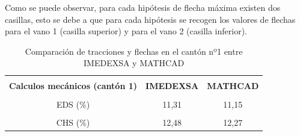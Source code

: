 Como se puede observar, para cada hipótesis de flecha máxima existen dos casillas, esto se debe a que para cada hipótesis se recogen los valores de flechas para el vano 1 (casilla superior) y para el vano 2 (casilla inferior).
\begin{table}[H]
\caption{Comparación de tracciones y flechas en el cantón nº1 entre IMEDEXSA y MATHCAD}
\centering
\label{tab:flechas}
\begin{tabular}{|cc|cc|}
\hline
\multicolumn{2}{|c|}{\cellcolor[HTML]{EFEFEF}}                                                                                                                                                       & \multicolumn{1}{c|}{\cellcolor[HTML]{EFEFEF}}                                    & \cellcolor[HTML]{EFEFEF}                                   \\
\multicolumn{2}{|c|}{\multirow{-2}{*}{\cellcolor[HTML]{EFEFEF}\textbf{Calculos mecánicos (cantón 1)}}}                                                                                               & \multicolumn{1}{c|}{\multirow{-2}{*}{\cellcolor[HTML]{EFEFEF}\textbf{IMEDEXSA}}} & \multirow{-2}{*}{\cellcolor[HTML]{EFEFEF}\textbf{MATHCAD}} \\ \hline
\multicolumn{2}{|c|}{}                                                                                                                                                                               & \multicolumn{1}{c|}{}                                                            &                                                            \\
\multicolumn{2}{|c|}{\multirow{-2}{*}{EDS (\%)}}                                                                                                                                                     & \multicolumn{1}{c|}{\multirow{-2}{*}{11,31}}                                     & \multirow{-2}{*}{11,15}                                    \\ \hline
\multicolumn{2}{|c|}{}                                                                                                                                                                               & \multicolumn{1}{c|}{}                                                            &                                                            \\
\multicolumn{2}{|c|}{\multirow{-2}{*}{CHS (\%)}}                                                                                                                                                     & \multicolumn{1}{c|}{\multirow{-2}{*}{12,48}}                                     & \multirow{-2}{*}{12,27}                                    \\ \hline

\end{tabular}
\end{table}
